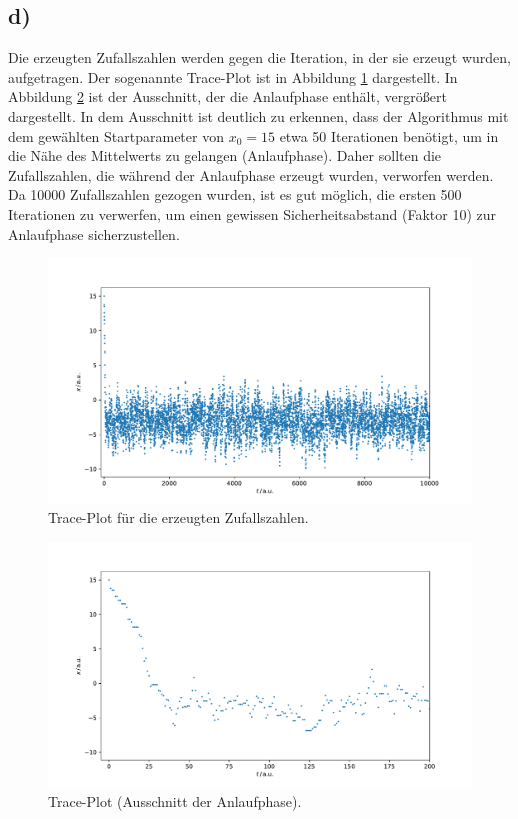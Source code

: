\documentclass[a4paper, 11pt]{article}
\begin{document}
\subsection*{d)}
Die erzeugten Zufallszahlen werden gegen die Iteration, in der sie erzeugt wurden,
aufgetragen. Der sogenannte Trace-Plot ist in Abbildung \ref{fig:trace} dargestellt.
In Abbildung \ref{fig:trace-zoom} ist der Ausschnitt, der die Anlaufphase enthält,
vergrößert dargestellt. In dem Ausschnitt ist deutlich zu erkennen, dass der
Algorithmus mit dem gewählten Startparameter von $x_0 = 15$ etwa 50 Iterationen
benötigt, um in die Nähe des Mittelwerts zu gelangen (Anlaufphase). Daher sollten
die Zufallszahlen, die während der Anlaufphase erzeugt wurden, verworfen werden.
Da 10000 Zufallszahlen gezogen wurden, ist es gut möglich, die ersten 500 Iterationen
zu verwerfen, um einen gewissen Sicherheitsabstand (Faktor 10) zur Anlaufphase
sicherzustellen.
\begin{figure}
  \centering
  \includegraphics[width=\textwidth]{../A15/A15d}
  \caption{Trace-Plot für die erzeugten Zufallszahlen.}
  \label{fig:trace}
\end{figure}
\begin{figure}
  \centering
  \includegraphics[width=\textwidth]{../A15/A15d_zoom}
  \caption{Trace-Plot (Ausschnitt der Anlaufphase).}
  \label{fig:trace-zoom}
\end{figure}
\FloatBarrier

\end{document}
